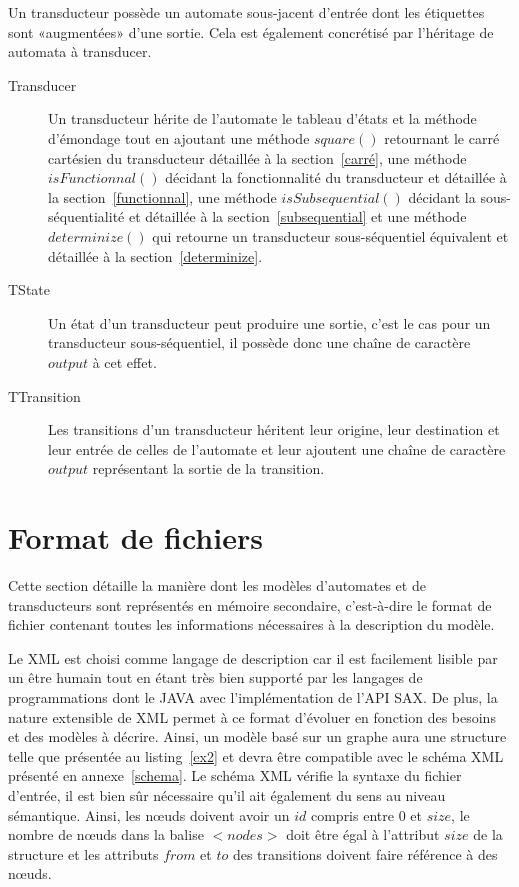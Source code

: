 	Un transducteur possède un automate sous-jacent d'entrée dont les étiquettes sont «augmentées» d'une sortie. Cela est également concrétisé par l'héritage de automata à transducer.
	\begin{description}
		\item[Transducer] Un transducteur hérite de l'automate le tableau d'états et la méthode d'émondage tout en ajoutant une méthode $square()$ retournant le carré cartésien du transducteur détaillée à la section~\ref{carré}, une méthode $isFunctionnal()$ décidant la fonctionnalité du transducteur et détaillée à la section~\ref{functionnal}, une méthode $isSubsequential()$ décidant la sous-séquentialité et détaillée à la section~\ref{subsequential} et une méthode $determinize()$ qui retourne un transducteur sous-séquentiel équivalent et détaillée à la section~\ref{determinize}.
		\item[TState] Un état d'un transducteur peut produire une sortie, c'est le cas pour un transducteur sous-séquentiel, il possède donc une chaîne de caractère $output$ à cet effet.
		\item[TTransition] Les transitions d'un transducteur héritent leur origine, leur destination et leur entrée de celles de l'automate et leur ajoutent une chaîne de caractère $output$ représentant la sortie de la transition. \\
	\end{description}
	
\section{Format de fichiers}
\label{format}

	Cette section détaille la manière dont les modèles d'automates et de transducteurs sont représentés en mémoire secondaire, c'est-à-dire le format de fichier contenant toutes les informations nécessaires à la description du modèle.
	
	Le XML est choisi comme langage de description car il est facilement lisible par un être humain tout en étant très bien supporté par les langages de programmations dont le JAVA avec l'implémentation de l'API SAX. De plus, la nature extensible de XML permet à ce format d'évoluer en fonction des besoins et des modèles à décrire. Ainsi, un modèle basé sur un graphe aura une structure telle que présentée au listing~\ref{ex2} et devra être compatible avec le schéma XML présenté en annexe~\ref{schema}. Le schéma XML vérifie la syntaxe du fichier d'entrée, il est bien sûr nécessaire qu'il ait également du sens au niveau sémantique. Ainsi, les nœuds doivent avoir un $id$ compris entre $0$ et $size$, le nombre de nœuds dans la balise $<nodes>$ doit être égal à l'attribut $size$ de la structure et les attributs $from$ et $to$ des transitions doivent faire référence à des nœuds.

